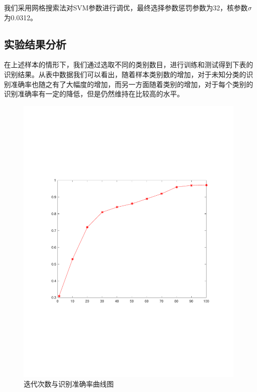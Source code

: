 我们采用网格搜索法对SVM参数进行调优，最终选择参数惩罚参数为32，核参数$\sigma$为0.0312。

\subsection{实验结果分析}

在上述样本的情形下，我们通过选取不同的类别数目，进行训练和测试得到下表的识别结果。从表中数据我们可以看出，随着样本类别数的增加，对于未知分类的识别准确率也随之有了大幅度的增加，而另一方面随着类别的增加，对于每个类别的识别准确率有一定的降低，但是仍然维持在比较高的水平。
\begin{figure}
	\centering
	\includegraphics[width=\textwidth]{figures/diff_epoch.pdf}
	\caption{迭代次数与识别准确率曲线图}
\end{figure}

